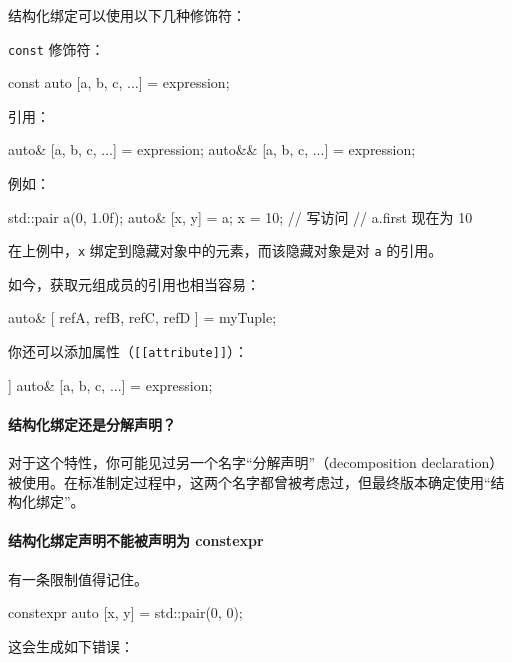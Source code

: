 结构化绑定可以使用以下几种修饰符：

\texttt{const} 修饰符：

\begin{codebox}[cpp]
const auto [a, b, c, ...] = expression;
\end{codebox}

引用：

\begin{codebox}[cpp]
auto& [a, b, c, ...] = expression;
auto&& [a, b, c, ...] = expression;
\end{codebox}

例如：

\begin{codebox}[cpp]
std::pair a(0, 1.0f);
auto& [x, y] = a;
x = 10;
// 写访问
// a.first 现在为 10
\end{codebox}

在上例中，\texttt{x} 绑定到隐藏对象中的元素，而该隐藏对象是对 \texttt{a} 的引用。

如今，获取元组成员的引用也相当容易：

\begin{codebox}[cpp]
auto& [ refA, refB, refC, refD ] = myTuple;
\end{codebox}

你还可以添加属性（\texttt{\texttt{\texttt{[[attribute]]}}}）：

\begin{codebox}[cpp]
[[maybe_unused]] auto& [a, b, c, ...] = expression;
\end{codebox}

\paragraph{结构化绑定还是分解声明？}

对于这个特性，你可能见过另一个名字“分解声明”（decomposition declaration）被使用。在标准制定过程中，这两个名字都曾被考虑过，但最终版本确定使用“结构化绑定”。

\paragraph{结构化绑定声明不能被声明为 constexpr}

有一条限制值得记住。

\begin{codebox}[cpp]
constexpr auto [x, y] = std::pair(0, 0);
\end{codebox}

这会生成如下错误：

